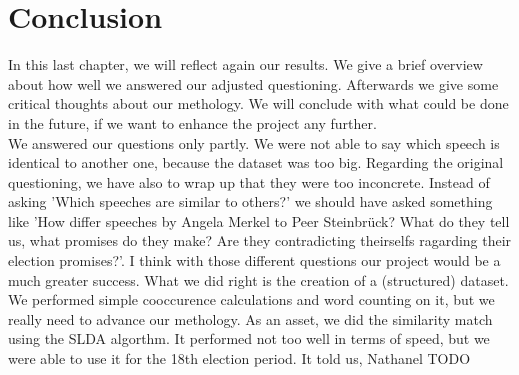 \documentclass[12pt,paper=a4,nenglish]{scrreprt}
\begin{document}
\chapter{Conclusion}
In this last chapter, we will reflect again our results. We give a brief
overview about how well we answered our adjusted questioning. Afterwards we
give some critical thoughts about our methology. We will conclude with what
could be done in the future, if we want to enhance the project any further.\\
We answered our questions only partly. We were not able to say which speech is
identical to another one, because the dataset was too big. 
Regarding the original questioning, we have also to wrap up that they were 
too inconcrete. Instead of asking 'Which speeches are similar to others?' we
should have asked something like 'How differ speeches by Angela Merkel to Peer
Steinbrück? What do they tell us, what promises do they make? Are they
contradicting theirselfs ragarding their election promises?'. 
I think with those different questions our project would be a much greater success. What we did right is the creation of a
(structured) dataset. We performed simple cooccurence calculations and word
counting on it, but we really need to advance our methology. As an asset, we
did the similarity match using the SLDA algorthm. It performed not too well in
terms of speed, but we were able to use it for the 18th election period. It told
us, Nathanel TODO





\end{document}
